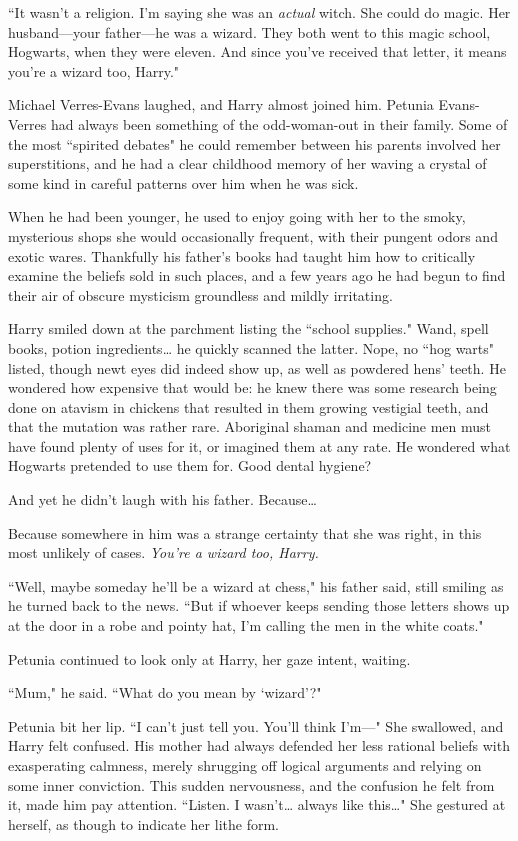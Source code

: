 ``It wasn't a religion. I'm saying she was an \emph{actual} witch.
She could do magic. Her husband---your father---he was a
wizard. They both went to this magic school, Hogwarts,
when they were eleven. And since you've received that letter, it
means you're a wizard too, Harry."

Michael Verres-Evans laughed, and Harry almost joined
him. Petunia Evans-Verres had always been something of
the odd-woman-out in their family. Some of the most
``spirited debates" he could remember between his parents
involved her superstitions, and he had a clear childhood
memory of her waving a crystal of some kind in careful
patterns over him when he was sick.

When he had been younger, he used to enjoy going with her to
the smoky, mysterious shops she would occasionally
frequent, with their pungent odors and exotic wares.
Thankfully his father's books had taught him how to
critically examine the beliefs sold in such places, and a few
years ago he had begun to find their air of obscure
mysticism groundless and mildly irritating.

Harry smiled down at the parchment listing the ``school
supplies." Wand, spell books, potion ingredients{\ldots} he quickly
scanned the latter. Nope, no ``hog warts" listed, though
newt eyes did indeed show up, as well as powdered hens'
teeth. He wondered how expensive that would be: he
knew there was some research being done on atavism in
chickens that resulted in them growing vestigial teeth, and
that the mutation was rather rare. Aboriginal shaman and
medicine men must have found plenty of uses for it, or
imagined them at any rate. He wondered what Hogwarts
pretended to use them for. Good dental hygiene?

And yet he didn't laugh with his father. Because{\ldots}

Because somewhere in him was a strange certainty that
she was right, in this most unlikely of cases.
\emph{You're a wizard too, Harry.}

``Well, maybe someday he'll be a wizard at chess," his
father said, still smiling as he turned back to the news.
``But if whoever keeps sending those letters shows up at
the door in a robe and pointy hat, I'm calling the men in
the white coats."

Petunia continued to look only at Harry, her gaze intent,
waiting.

``Mum," he said. ``What do you mean by `wizard'?"

Petunia bit her lip. ``I can't just tell you. You'll think I'm---"
She swallowed, and Harry felt confused. His mother had
always defended her less rational beliefs with
exasperating calmness, merely shrugging off logical arguments
and relying on some inner conviction. This sudden
nervousness, and the confusion he felt from it, made him
pay attention. ``Listen. I wasn't{\ldots} always like this{\ldots}" She
gestured at herself, as though to indicate her lithe form.

